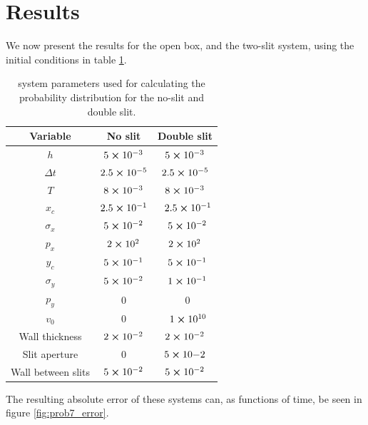 \documentclass[english,notitlepage,reprint,nofootinbib]{revtex4-2}  %
\begin{document}
	\section{Results}\label{sec:results}
	We now present the results for the open box, and the two-slit system, using the initial conditions in table \ref{tab:1}.
	\begin{table}[h!]
	\centering
	\caption{system parameters used for calculating the probability distribution for the no-slit and double slit.}
	\label{tab:1}
	\begin{tabular}{c | c | c} %
	 Variable& No slit & Double slit\\
	\hline
	$h$                & $5\cross10^{-3}$                &\quad $5\cross10^{-3}$   \\
	$\Delta t$       & $2.5\cross10^{-5}$            &\quad $2.5\cross10^{-5}$  \\
	$T$                & $8\cross10^{-3}$               &\quad $8\cross10^{-3}$     \\
	$x_c$             & $2.5\cross10^{-1}$            &\quad $2.5\cross10^{-1}$  \\
	$\sigma_x$    & $5\cross10^{-2}$               &\quad $5\cross10^{-2}$     \\
	$p_x$             & $2\cross10^{2}$                &\quad $2\cross10^{2}$      \\
	$y_c$             & $5\cross10^{-1}$               &\quad $5\cross10^{-1}$     \\
	$\sigma_y$    & $5\cross10^{-2}$               &\quad $1\cross10^{-1}$     \\
	$p_y$             & $0$                                    &\quad $0$                         \\
	$v_0$             & $0$                                    &\quad $1\cross10^{10}$    \\
	Wall thickness      & $2\cross10^{-2}$               & $2\cross10^{-2}$        \\
	Slit aperture          & $0$                                     & $5\cross10{-2}$        \\
	Wall between slits & $5\cross10^{-2}$          & $5\cross10^{-2}$            \\
	\hline
	\end{tabular}
	\end{table}
	The resulting absolute error of these systems can, as functions of time, be seen in figure \ref{fig:prob7_error}.
	
\end{document}
